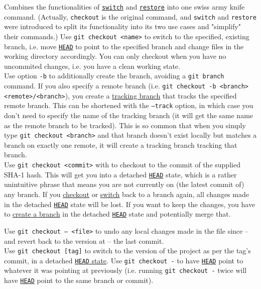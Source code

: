 \documentclass[table, xcdraw]{article}%
\begin{document}
Combines the functionalities of \hyperref[switch]{\texttt{switch}} and \hyperref[restore]{\texttt{restore}} into one swiss army knife command. (Actually, \texttt{checkout} is the original command, and \texttt{switch} and \texttt{restore} were introduced to split its functionality into its two use cases and "simplify" their commands.)
Use \texttt{git checkout <name>} to switch to the specified, existing branch, i.e. move \hyperref[branching]{\texttt{HEAD}} to point to the specified branch and change files in the working directory accordingly. You can only checkout when you have no uncommited changes, i.e. you have a clean working state.\\
Use option \texttt{-b} to additionally create the branch, avoiding a \texttt{git branch} command. If you also specify a remote branch (i.e. \texttt{git checkout -b <branch> <remote>/<branch>}), you create a \hyperref[remotes]{tracking branch} that tracks the specified remote branch. This can be shortened with the \texttt{--track} option, in which case you don't need to specify the name of the tracking branch (it will get the same name as the remote branch to be tracked). This is so common that when you simply type \texttt{git checkout <branch>} and that branch doesn't exist locally but matches a branch on exactly one remote, it will create a tracking branch tracking that branch.\\
Use \texttt{git checkout <commit>} with to checkout to the commit of the supplied SHA-1 hash. This will get you into a detached \hyperref[branching]{\texttt{HEAD}} state, which is a rather unintuitive phrase that means you are not currently on (the latest commit of) any branch. If you \hyperref[checkout]{checkout} or \hyperref[switch]{switch} back to a branch again, all changes made in the detached \hyperref[branching]{\texttt{HEAD}} state will be lost. If you want to keep the changes, you have to \hyperref[branch]{create a branch} in the detached \hyperref[branching]{\texttt{HEAD}} state and potentially merge that.

Use \texttt{git checkout -- <file>} to undo any local changes made in the file since -- and revert back to the version at -- the last commit.\\
Use \texttt{git checkout [tag]} to switch to the version of the project as per the tag's commit, in a detached \hyperref[branching]{\texttt{HEAD} state}.
Use \texttt{git checkout -} to have \hyperref[branching]{\texttt{HEAD}} point to whatever it was pointing at previously (i.e. running \texttt{git checkout -} twice will have \hyperref[branching]{\texttt{HEAD}} point to the same branch or commit).
\end{document}
